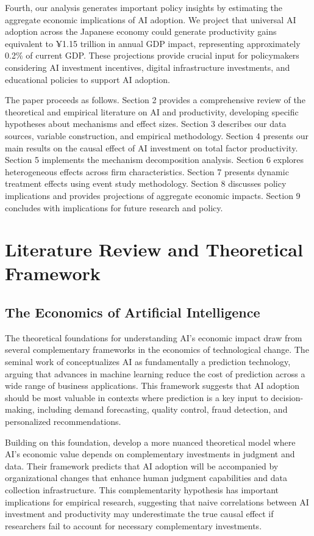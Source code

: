 \documentclass[12pt]{article}
\begin{document}
Fourth, our analysis generates important policy insights by estimating the aggregate economic implications of AI adoption. We project that universal AI adoption across the Japanese economy could generate productivity gains equivalent to ¥1.15 trillion in annual GDP impact, representing approximately 0.2\% of current GDP. These projections provide crucial input for policymakers considering AI investment incentives, digital infrastructure investments, and educational policies to support AI adoption.

The paper proceeds as follows. Section 2 provides a comprehensive review of the theoretical and empirical literature on AI and productivity, developing specific hypotheses about mechanisms and effect sizes. Section 3 describes our data sources, variable construction, and empirical methodology. Section 4 presents our main results on the causal effect of AI investment on total factor productivity. Section 5 implements the mechanism decomposition analysis. Section 6 explores heterogeneous effects across firm characteristics. Section 7 presents dynamic treatment effects using event study methodology. Section 8 discusses policy implications and provides projections of aggregate economic impacts. Section 9 concludes with implications for future research and policy.

\section{Literature Review and Theoretical Framework}

\subsection{The Economics of Artificial Intelligence}

The theoretical foundations for understanding AI's economic impact draw from several complementary frameworks in the economics of technological change. The seminal work of \citet{brynjolfsson2019artificial} conceptualizes AI as fundamentally a prediction technology, arguing that advances in machine learning reduce the cost of prediction across a wide range of business applications. This framework suggests that AI adoption should be most valuable in contexts where prediction is a key input to decision-making, including demand forecasting, quality control, fraud detection, and personalized recommendations.

Building on this foundation, \citet{agrawal2018prediction} develop a more nuanced theoretical model where AI's economic value depends on complementary investments in judgment and data. Their framework predicts that AI adoption will be accompanied by organizational changes that enhance human judgment capabilities and data collection infrastructure. This complementarity hypothesis has important implications for empirical research, suggesting that naive correlations between AI investment and productivity may underestimate the true causal effect if researchers fail to account for necessary complementary investments.
\end{document}

